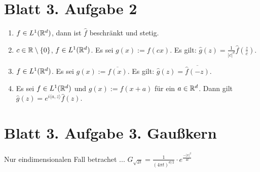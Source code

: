 \documentclass[
 ngerman]{report}
\begin{document}
\section*{Blatt 3. Aufgabe 2}

\begin{enumerate}[1.]
	\item $f \in L^1(\mathbb{R}^d)$, dann ist $\hat{f}$ beschränkt und stetig. 
	\item $c\in \mathbb{R} \setminus \left\{0\right\}$, $f\in L^1(\mathbb{R}^d)$. Es sei $g(x) := f(cx)$. 
		Es gilt: $\hat{g}(z) = \frac {1} {|c|^d} \hat{f} ( \frac {z} {c})$.
	\item $f \in L^1(\mathbb{R}^d)$. Es sei $g(x) := \overline{f(x)}$.
		Es gilt: $\hat{g}(z) = \overline{\hat{f}(-z)}$.
	\item Es sei $f\in L^1(\mathbb{R}^d)$ und $g(x) := f(x+a)$ für ein $a\in \mathbb{R}^d$.	
		Dann gilt $\hat{g}(z) = e^{i\langle a, z \rangle}\hat{f}(z)$.
\end{enumerate}
\section*{Blatt 3. Aufgabe 3. Gaußkern}
Nur eindimensionalen Fall betrachet ...
$G_{\sqrt{2t}} = \frac {1} {(4 \pi t)^{d/2}} 
\cdot e^{ \frac {-|x|^2} {4t}} $
\end{document}

